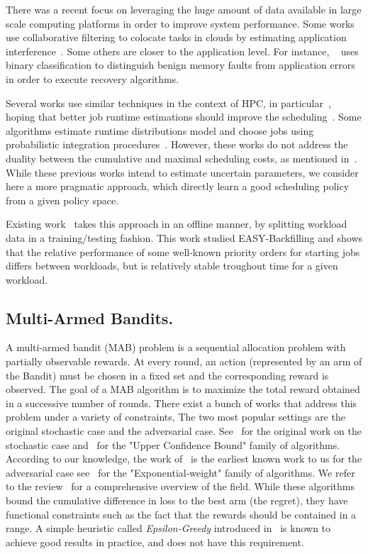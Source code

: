 \documentclass[sigconf,review]{acmart}
\begin{document}
There was a recent focus on leveraging the huge amount of data available in
large scale computing platforms in order to improve system performance. Some
works use collaborative filtering to colocate tasks in clouds by estimating
application interference~\cite{7516031}. Some others are closer to the
application level. For instance, ~\cite{fmodeling} uses binary classification
to distinguish benign memory faults from application errors in order to execute
recovery algorithms.

Several works use similar techniques in the context of HPC, in
particular~\cite{Tsafrir_easypp_2005,learningruntimes}, hoping that better job
runtime estimations should improve the scheduling~\cite{chiang_impact_2002}.
Some algorithms estimate runtime distributions model and choose jobs using
probabilistic integration procedures~\cite{Nissimov2008}.  However, these works
do not address the duality between the cumulative and maximal scheduling costs,
as mentioned in~\cite{learningruntimes}. While these previous works intend to
estimate uncertain parameters, we consider here a more pragmatic approach,
which directly learn a good scheduling policy from a given policy space.

Existing work~\cite{jsspp17} takes this approach in an offline manner, by
splitting workload data in a training/testing fashion. This work studied
EASY-Backfilling and shows that the relative performance of some well-known
priority orders for starting jobs differs between workloads, but is relatively
stable troughout time for a given workload.

\subsection{Multi-Armed Bandits.}

A multi-armed bandit (MAB) problem is a sequential allocation problem with
partially observable rewards. At every round, an action (represented by an arm
of the Bandit) must be chosen in a fixed set and the corresponding reward is
observed. The goal of a MAB algorithm is to maximize the total reward obtained
in a successive number of rounds.  There exist a bunch of works that address
this problem under a variety of constraints, The two most popular settings are
the original stochastic  case and the adversarial case. See~\cite{thompson} for
the original work on the stochastic case and~\cite{Auer2002} for the "Upper
Confidence Bound" family of algorithms. According to our knowledge, the work
of~\cite{Banos} is the earliest known work to us for the adversarial case
see~\cite{nonstoch} for the "Exponential-weight" family of algorithms. We refer
to the review~\cite{bubnow} for a comprehensive overview of the field. While
these algorithms bound the cumulative difference in loss to the best arm (the
regret), they have functional constraints such as the fact that the rewards
should be contained in a range. A simple heuristic called
\textit{Epsilon-Greedy} introduced in~\cite{Auer2002} is known to achieve good
results in practice, and does not have this requirement.
\end{document}

